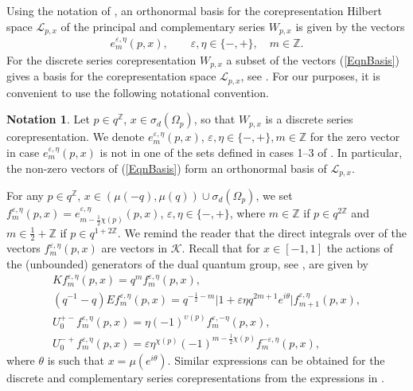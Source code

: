\documentclass[pdftex]{sigma}
\numberwithin{equation}{section}
\theoremstyle{definition}
\newtheorem{nt}[thm]{Notation}
\newcommand{\ep}{\varepsilon}
\begin{document}
 Using the notation of \cite[Sections 10.2 and 10.3]{GroKoeKus}, an orthonormal basis for the corepresentation
Hilbert space $\mathcal{L}_{p,x}$ of the principal and complementary series $W_{p,x}$ is given by the
vectors
\begin{gather}\label{EqnBasis}
e^{\ep, \eta}_m (p,x), \qquad \ep, \eta \in \{ -, + \}, \quad m \in \mathbb{Z}.
\end{gather}
 For the discrete series corepresentation $W_{p,x}$ a subset of the vectors (\ref{EqnBasis}) gives a basis for the corepresentation space $\mathcal{L}_{p,x}$, see \cite[Proposition~5.2]{GroKoeKus}. For our purposes, it is convenient to use the following notational convention.
\begin{nt}\label{NtZeroVectors}
Let $p \in q^\mathbb{Z}$, $x \in \sigma_d(\Omega_p)$, so that $W_{p,x}$ is a discrete series corepresentation. We denote $e^{\ep, \eta}_m (p,x)$, $\ep, \eta \in \{ -, + \}, m \in \mathbb{Z}$ for the zero vector in case $e^{\ep, \eta}_m(p,x)$ is not in one of the sets def\/ined in cases 1--3 of \cite[Proposition 5.2]{GroKoeKus}. In particular, the non-zero vectors of (\ref{EqnBasis}) form an orthonormal basis of $\mathcal{L}_{p,x}$.
\end{nt}

For any $p \in q^{\mathbb{Z}}$, $x \in (\mu(-q), \mu(q)) \cup \sigma_d(\Omega_p)$, we set $f^{\ep, \eta}_m (p,x) = e^{\ep, \eta}_{m-\frac{1}{2} \chi(p)} (p,x)$, $\ep, \eta \in \{ -, + \}$, where $m \in
 \mathbb{Z}$ if $p \in q^{2 \mathbb{Z}}$ and $m \in \frac{1}{2} + \mathbb{Z}$ if $p \in q^{1+2\mathbb{Z}}$. We remind the reader that the direct integrals over of the vectors $f^{\ep, \eta}_{m}(p,x)$ are vectors in $\mathcal{K}$.
Recall that for $x \in [-1,1]$ the actions of the (unbounded) generators of the dual quantum group, see \cite[equation~(92)]{GroKoeKus}, are given by
\begin{gather}
K f^{\ep, \eta}_m(p,x)  = q^m  f^{\ep, \eta}_m(p,x), \nonumber\\
(q^{-1} - q) E  f^{\ep, \eta}_m(p,x)  = q^{-\frac{1}{2}-m} \vert 1 + \ep \eta q^{2m +1} e^{i \theta} \vert  f^{\ep, \eta}_{m+1}(p,x) , \nonumber\\
U_0^{+ -}  f^{\ep, \eta}_m(p,x)  =  \eta (-1)^{\upsilon(p)}  f^{\ep, -\eta}_{m}(p,x), \nonumber\\
U_0^{-+}  f^{\ep, \eta}_m(p,x)  = \ep \eta^{\chi(p)} (-1)^{m - \frac{1}{2} \chi(p)}  f^{-\ep, \eta}_{m}(p,x),\label{EqnKAction}
\end{gather}
where $\theta$ is such that $x = \mu(e^{i\theta})$.
Similar expressions can be obtained for the discrete and complementary series corepresentations from the expressions in \cite[Lemma~10.1 and Section~10.3]{GroKoeKus}.
\end{document}
